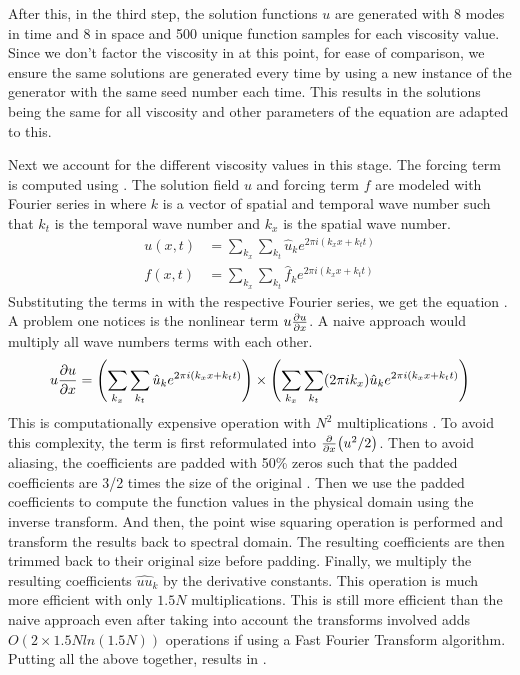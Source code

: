 After this, in the third step, the solution functions \(u \) are generated with 8 modes in time and 8 in space and 500 unique function samples for each viscosity value. Since we don't factor the viscosity in at this point, for ease of comparison, we ensure the same solutions are generated every time by using a new instance of the generator with the same seed number each time. This results in the solutions being the same for all viscosity and other parameters of the equation are adapted to this.

Next we account for the different viscosity values in this stage. The forcing term is computed using . The solution field \(u\) and forcing term \(f\) are modeled with Fourier series in  where \(k\) is a vector of spatial and temporal wave number such that \(k_t\) is the temporal wave number and \(k_x\) is the spatial wave number.
\begin{align}
  u\left(x, t \right) & = \sum_{k_{x}} \sum_{k_{t}} \hat{u}_k e^{2\pi i(k_{x}x+k_{t}t)} \label{eq:fourier_field} \\
  f\left(x, t \right) & = \sum_{k_{x}}\sum_{k_{t}} \hat{f}_k e^{2\pi i(k_{x}x+k_{t}t)} \label{eq:fourier_force}
\end{align}
Substituting the terms in  with the respective Fourier series, we get the equation . A problem one notices is the nonlinear term \(u\pdv{u}{x}\). A naive approach would multiply all wave numbers terms with each other.
\begin{align}
  u\pdv{u}{x} = \left(\sum_{k_{x}} \sum_{k_{t}} \hat{u}_k e^{2\pi i(k_{x}x+k_{t}t)}\right) \times \left(\sum_{k_{x}} \sum_{k_{t}} (2\pi i k_{x})\hat{u}_k e^{2\pi i(k_{x}x+k_{t}t)}\right)
\end{align}
This is computationally expensive operation with \(N^2\) multiplications \autocite{lariosMATH934BURGERS2021,robertsDealiasedConvolutionsPseudospectral2011,shenSpectralMethodsAlgorithms2011,orszagComparisonPseudospectralSpectral1972}. To avoid this complexity, the term is first reformulated into \(\pdv{x}(u^2/2)\). Then to avoid aliasing, the coefficients are padded with 50\% zeros such that the padded coefficients are 3/2 times the size of the original \autocite{orszagEliminationAliasingFiniteDifference1971, lariosMATH934BURGERS2021}. Then we use the padded coefficients to compute the function values in the physical domain using the inverse transform. And then, the point wise squaring operation is performed and transform the results back to spectral domain. The resulting coefficients are then trimmed back to their original size before padding. Finally, we multiply the resulting coefficients \(\hat{uu}_k\) by the derivative constants. This operation is much more efficient with only \(1.5 N\) multiplications. This is still more efficient than the naive approach even after taking into account the transforms involved adds \(O(2\times 1.5Nln(1.5N))\) operations if using a Fast Fourier Transform algorithm. Putting all the above together, results in .
